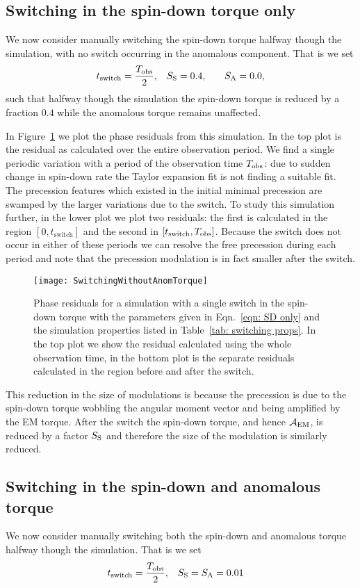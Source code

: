 \documentclass[../full_thesis/full_thesis.tex]{subfiles}
\begin{document}
\subsection{Switching in the spin-down torque only}
We now consider manually switching the spin-down torque halfway though the
simulation, with no switch occurring in the anomalous component.
That is we set
\begin{align}
    t_{\mathrm{switch}} = \frac{T_{\textrm{obs}}}{2}, &&& S_{\mathrm{S}} = 0.4, &&& S_{\mathrm{A}} = 0.0,
\label{eqn: SD only}
\end{align}
such that halfway though the simulation the spin-down torque is reduced by a
fraction $0.4$ while the anomalous torque remains unaffected.

In Figure~\ref{fig: switching without anom} we plot the phase residuals from
this simulation. In the top plot is the residual as calculated over the entire
observation period. We find a single periodic variation with a period of the
observation time $T_{\textrm{obs}}$: due to sudden change in spin-down rate the Taylor
expansion fit is not finding a suitable fit. The precession features which
existed in the initial minimal precession are swamped by the larger variations
due to the switch. To study this simulation further, in the lower plot we plot
two residuals: the first is calculated in the region $[0, t_{\mathrm{switch}}]$
and the second in $[t_{\mathrm{switch}}, T_{\textrm{obs}}]$. Because the switch does not
occur in either of these periods we can resolve the free precession during each
period and note that the precession modulation is in fact smaller after the
switch.
\begin{figure}[htb]
\texttt{[image: SwitchingWithoutAnomTorque]}
\caption{Phase residuals for a simulation with a single switch in the spin-down
torque with the parameters given in Eqn.~\eqref{eqn: SD only} and the
simulation properties listed in Table~\ref{tab: switching props}. In the top
plot we show the residual calculated using the whole observation time, in the
bottom plot is the separate residuals calculated in the region before and after
the switch.}
\label{fig: switching without anom}
\end{figure}
This reduction in the size of modulations is because the precession is due to
the spin-down torque wobbling the angular moment vector and being amplified by
the EM torque. After the switch the spin-down torque, and hence $\mathcal{A}_{\mathrm{EM}}$, is
reduced by a factor $S_{\mathrm{S}}$ and therefore the size of the modulation is similarly
reduced.

\subsection{Switching in the spin-down and anomalous torque}
We now consider manually switching both the spin-down and anomalous torque
halfway though the simulation.  That is we set
\begin{align}
    t_{\mathrm{switch}} = \frac{T_{\textrm{obs}}}{2}, &&& S_{\mathrm{S}} = S_{\mathrm{A}} = 0.01
\label{eqn: SD and A}
\end{align}
\end{document}
